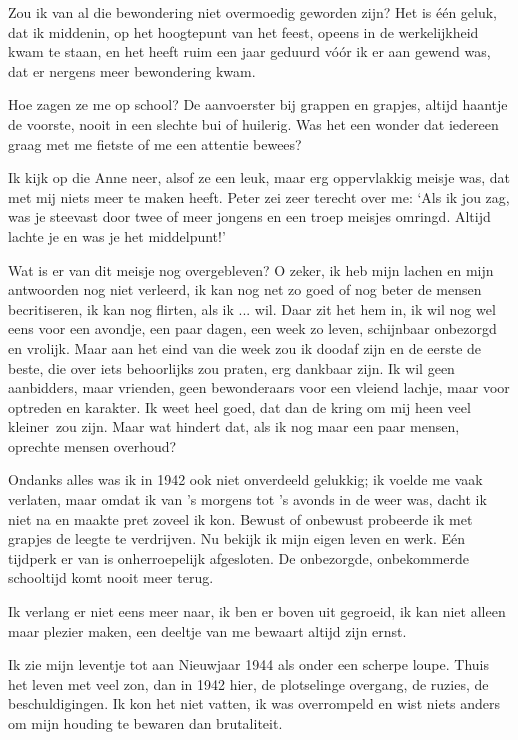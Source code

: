 \documentclass{book}
\begin{document}
Zou ik van al die bewondering niet overmoedig geworden zijn? Het is één geluk,
dat ik middenin, op het hoogtepunt van het feest, opeens in de werkelijkheid
kwam te staan, en het heeft ruim een jaar geduurd vóór ik er aan gewend was, dat
er nergens meer bewondering kwam.

Hoe zagen ze me op school? De aanvoerster bij grappen en grapjes, altijd haantje
de voorste, nooit in een slechte bui of huilerig. Was het een wonder dat
iedereen graag met me fietste of me een attentie bewees?

Ik kijk op die Anne neer, alsof ze een leuk, maar erg oppervlakkig meisje was,
dat met mij niets meer te maken heeft. Peter zei zeer terecht over me: `Als ik
jou zag, was je steevast door twee of meer jongens en een troep meisjes omringd.
Altijd lachte je en was je het middelpunt!'

Wat is er van dit meisje nog overgebleven? O zeker, ik heb mijn lachen en mijn
antwoorden nog niet verleerd, ik kan nog net zo goed of nog beter de mensen
becritiseren, ik kan nog flirten, als ik ... wil. Daar zit het hem in, ik wil
nog wel eens voor een avondje, een paar dagen, een week zo leven, schijnbaar
onbezorgd en vrolijk. Maar aan het eind van die week zou ik doodaf zijn en de
eerste de beste, die over iets behoorlijks zou praten, erg dankbaar zijn. Ik wil
geen aanbidders, maar vrienden, geen bewonderaars voor een vleiend lachje, maar
voor optreden en karakter. Ik weet heel goed, dat dan de kring om mij heen veel
kleiner~zou zijn. Maar wat hindert dat, als ik nog maar een paar mensen,
oprechte mensen overhoud?

Ondanks alles was ik in 1942 ook niet onverdeeld gelukkig; ik voelde me vaak
verlaten, maar omdat ik van 's morgens tot 's avonds in de weer was, dacht ik
niet na en maakte pret zoveel ik kon. Bewust of onbewust probeerde ik met
grapjes de leegte te verdrijven. Nu bekijk ik mijn eigen leven en werk. Eén
tijdperk er van is onherroepelijk afgesloten.  De onbezorgde, onbekommerde
schooltijd komt nooit meer terug.

Ik verlang er niet eens meer naar, ik ben er boven uit gegroeid, ik kan niet
alleen maar plezier maken, een deeltje van me bewaart altijd zijn ernst.

Ik zie mijn leventje tot aan Nieuwjaar 1944 als onder een scherpe loupe.  Thuis
het leven met veel zon, dan in 1942 hier, de plotselinge overgang, de ruzies, de
beschuldigingen. Ik kon het niet vatten, ik was overrompeld en wist niets anders
om mijn houding te bewaren dan brutaliteit.
\end{document}
